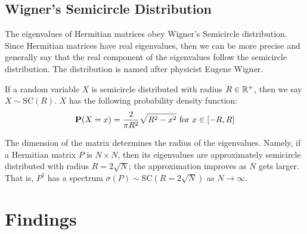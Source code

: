 
\newpage
\subsection{Wigner's Semicircle Distribution}

The eigenvalues of Hermitian matrices obey Wigner's Semicircle distribution.
Since Hermitian matrices have real eigenvalues, then we can be more precise and generally say that the real component of the eigenvalues follow the semicircle distribution.
The distribution is named after physicist Eugene Wigner.

\begin{definition}
If a random variable $X$ is semicircle distributed with radius $R \in \mathbb{R}^+$, then we say $X \sim \text{SC}(R)$. $X$ has the following probability density function:
$$\textbf{P}(X = x) = \frac{2}{\pi R^2} \sqrt{R^2 - x^2} \text{ for } x \in [-R, R]$$
\end{definition}

\begin{remark}
The dimension of the matrix determines the radius of the eigenvalues.
Namely, if a Hermitian matrix $P$ is $N \times N$, then its eigenvalues are approximately semicircle distributed with radius $R = 2\sqrt{N}$; the approximation improves as $N$ gets larger.
That is, $P^{\dagger}$ has a spectrum $\sigma({P}) \sim \text{SC}(R = 2\sqrt{N})$ as $N \to \infty$.
\end{remark}


\newpage
\section{Findings}
